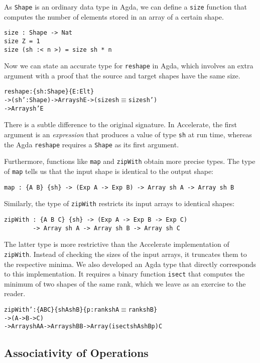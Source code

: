 \documentclass{llncs}
\begin{document}
As \texttt{Shape} is an ordinary data type in Agda, we can define a
\texttt{size} function that computes the number of elements stored in
an array of a certain shape.
\begin{verbatim}
size : Shape -> Nat
size Z = 1
size (sh :< n >) = size sh * n
\end{verbatim}
Now we can state an accurate type for \texttt{reshape} in Agda, which
involves an extra argument with a proof that the source and
target shapes have the same size.
\begin{alltt}
reshape : \{sh : Shape\} \{E : Elt\}
       -> (sh' : Shape) -> Array sh E -> (size sh \(\equiv\) size sh')
       -> Array sh' E
\end{alltt}
There is a subtle difference to the original signature. In
Accelerate, the first argument is an \emph{expression} that produces a
value of type \texttt{sh} at run time, whereas the Agda
\texttt{reshape} requires a \texttt{Shape} as its first argument.


Furthermore, functions like \texttt{map} and \texttt{zipWith} obtain
more precise types. The type of \texttt{map} tells us that the input
shape is identical to the output shape:
\begin{verbatim}
map : {A B} {sh} -> (Exp A -> Exp B) -> Array sh A -> Array sh B
\end{verbatim}
Similarly, the type of \texttt{zipWith} restricts its input arrays to
identical shapes:
\begin{verbatim}
zipWith : {A B C} {sh} -> (Exp A -> Exp B -> Exp C)
        -> Array sh A -> Array sh B -> Array sh C
\end{verbatim}
The latter type is more restrictive than the Accelerate implementation
of \texttt{zipWith}. Instead of checking the sizes of the input
arrays, it truncates them to the respective minima. We also developed
an Agda type that directly corresponds to this implementation. It
requires a binary function \texttt{isect} that computes the minimum of
two shapes of the same rank,
which we leave as an exercise to the reader.
\begin{alltt}
zipWith' : \{A B C\} \{shA shB\} \{p : rank shA \(\equiv\) rank shB\}
         -> (A -> B -> C)
         -> Array shA A -> Array shB B -> Array (isect shA shB p) C
\end{alltt}
\subsection{Associativity of Operations}
\label{sec:assoc-oper}
\end{document}
